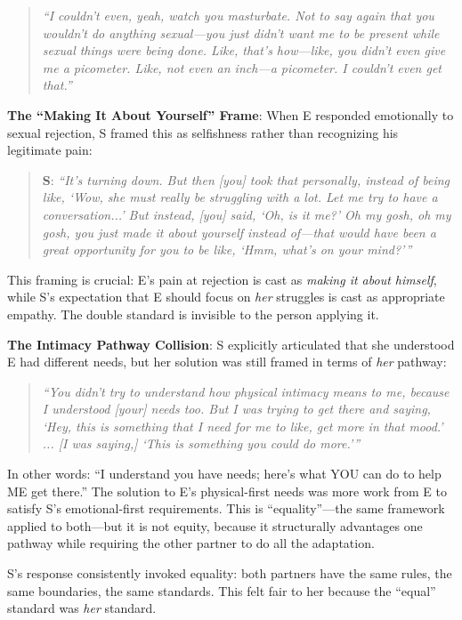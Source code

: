 \documentclass[12pt, letterpaper]{article}
\begin{document}
\begin{quote}
\textit{``I couldn't even, yeah, watch you masturbate. Not to say again that you wouldn't do anything sexual---you just didn't want me to be present while sexual things were being done. Like, that's how---like, you didn't even give me a picometer. Like, not even an inch---a picometer. I couldn't even get that.''}
\end{quote}

\textbf{The ``Making It About Yourself'' Frame}: When E responded emotionally to sexual rejection, S framed this as selfishness rather than recognizing his legitimate pain:

\begin{quote}
\textbf{S}: \textit{``It's turning down. But then [you] took that personally, instead of being like, `Wow, she must really be struggling with a lot. Let me try to have a conversation...' But instead, [you] said, `Oh, is it me?' Oh my gosh, oh my gosh, you just made it about yourself instead of---that would have been a great opportunity for you to be like, `Hmm, what's on your mind?'''}
\end{quote}

This framing is crucial: E's pain at rejection is cast as \textit{making it about himself}, while S's expectation that E should focus on \textit{her} struggles is cast as appropriate empathy. The double standard is invisible to the person applying it.

\textbf{The Intimacy Pathway Collision}: S explicitly articulated that she understood E had different needs, but her solution was still framed in terms of \textit{her} pathway:

\begin{quote}
\textit{``You didn't try to understand how physical intimacy means to me, because I understood [your] needs too. But I was trying to get there and saying, `Hey, this is something that I need for me to like, get more in that mood.' ... [I was saying,] `This is something you could do more.'''}
\end{quote}

In other words: ``I understand you have needs; here's what YOU can do to help ME get there.'' The solution to E's physical-first needs was more work from E to satisfy S's emotional-first requirements. This is ``equality''---the same framework applied to both---but it is not equity, because it structurally advantages one pathway while requiring the other partner to do all the adaptation.

S's response consistently invoked equality: both partners have the same rules, the same boundaries, the same standards. This felt fair to her because the ``equal'' standard was \textit{her} standard.
\end{document}
